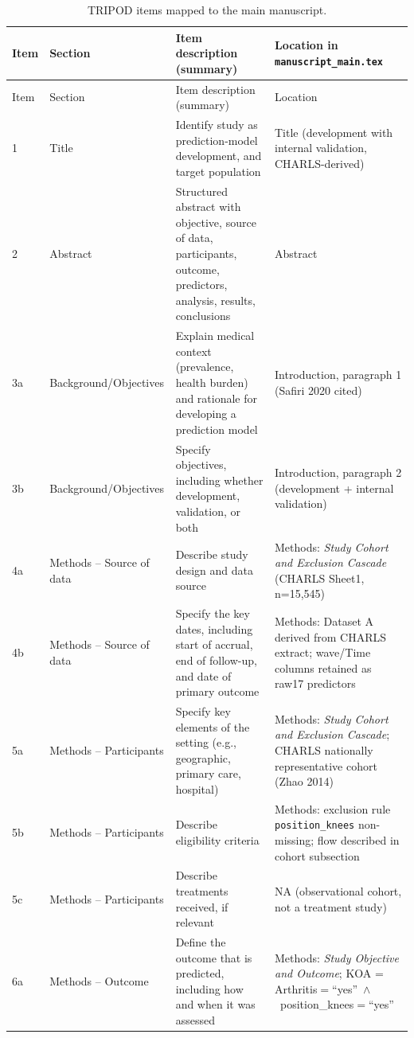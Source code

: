 \documentclass[11pt,a4paper]{article}
\begin{document}
\begin{longtable}{p{0.9cm} p{2.8cm} p{4.6cm} p{6.6cm}}
\caption{TRIPOD items mapped to the main manuscript.}\label{tab:tripod}\\
\toprule
Item & Section & Item description (summary) & Location in \texttt{manuscript\_main.tex} \\
\midrule
\endfirsthead
\toprule
Item & Section & Item description (summary) & Location \\
\midrule
\endhead
1 & Title & Identify study as prediction-model development, and target population & Title (development with internal validation, CHARLS-derived) \\
2 & Abstract & Structured abstract with objective, source of data, participants, outcome, predictors, analysis, results, conclusions & Abstract \\
3a & Background/Objectives & Explain medical context (prevalence, health burden) and rationale for developing a prediction model & Introduction, paragraph 1 (Safiri 2020 cited) \\
3b & Background/Objectives & Specify objectives, including whether development, validation, or both & Introduction, paragraph 2 (development + internal validation) \\
4a & Methods -- Source of data & Describe study design and data source & Methods: \emph{Study Cohort and Exclusion Cascade} (CHARLS Sheet1, n=15{,}545) \\
4b & Methods -- Source of data & Specify the key dates, including start of accrual, end of follow-up, and date of primary outcome & Methods: Dataset A derived from CHARLS extract; wave/Time columns retained as raw17 predictors \\
5a & Methods -- Participants & Specify key elements of the setting (e.g., geographic, primary care, hospital) & Methods: \emph{Study Cohort and Exclusion Cascade}; CHARLS nationally representative cohort (Zhao 2014) \\
5b & Methods -- Participants & Describe eligibility criteria & Methods: exclusion rule \texttt{position\_knees} non-missing; flow described in cohort subsection \\
5c & Methods -- Participants & Describe treatments received, if relevant & NA (observational cohort, not a treatment study) \\
6a & Methods -- Outcome & Define the outcome that is predicted, including how and when it was assessed & Methods: \emph{Study Objective and Outcome}; KOA = Arthritis$=$``yes''\ $\wedge$\ position\_knees$=$``yes'' \\

\end{longtable}
\end{document}
